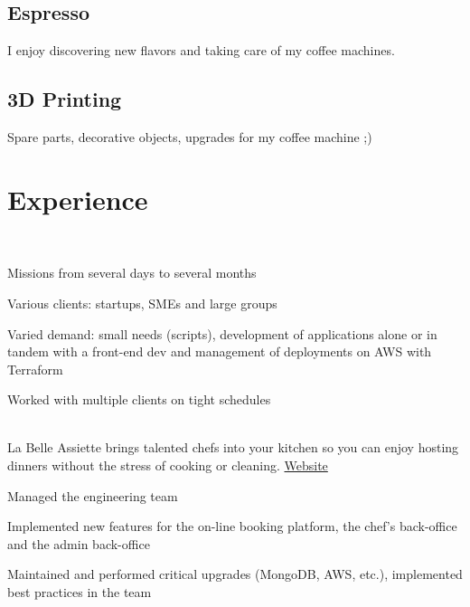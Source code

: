 \documentclass[
  english,
  a4paper
]{resume-openfont}
\begin{document}
\begin{minipage}[t]{0.31\textwidth}
\subsection{Espresso}
I enjoy discovering new flavors and taking care of my coffee machines.
\sectionsep

\subsection{3D Printing}
Spare parts, decorative objects, upgrades for my coffee machine ;)

%
%
\end{minipage}%
\hfill%
\begin{minipage}[t]{0.66\textwidth}


\section{Experience}

%
\\
\vspace{0.5\topsep}
\begin{tightemize}
\item Missions from several days to several months
\item Various clients: startups, SMEs and large groups
\item Varied demand: small needs (scripts), development of applications alone or in tandem with a front-end dev and management of deployments on AWS with Terraform
\item Worked with multiple clients on tight schedules
\end{tightemize}
\sectionsep


%
%
\\
La Belle Assiette brings talented chefs into your kitchen so you can enjoy hosting dinners without the stress of cooking or cleaning. \href{https://labelleassiette.co.uk}{Website}
\vspace{\topsep}
\begin{tightemize}
\item Managed the engineering team
\item Implemented new features for the on-line booking platform, the chef's back-office and the admin back-office
\item Maintained and performed critical upgrades (MongoDB, AWS, etc.), implemented best practices in the team
\end{tightemize}
\sectionsep


\end{minipage}
\end{document}
